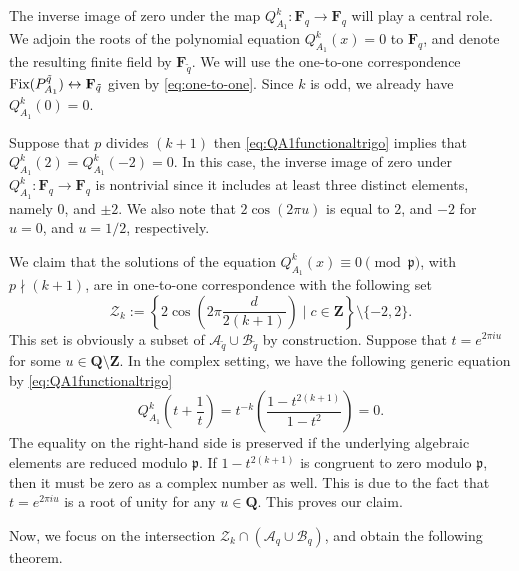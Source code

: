 \documentclass{amsart}
\newcommand{\mf}{\mathfrak}
\newcommand{\mc}{\mathcal}
\newcommand{\Q}{\mathbf Q}
\newcommand{\Z}{\mathbf Z}
\newcommand{\F}{\mathbf F}
\newcommand{\Fix}{\textnormal{Fix}}
\numberwithin{equation}{section}
\theoremstyle{plain}
\theoremstyle{definition}
\begin{document}
The inverse image of zero under the map $Q_{A_{1}}^{k} : \F_{q} \to \F_{q}$ will play a central role. We adjoin the roots of the polynomial equation $Q_{A_{1}}^{k}(x)=0$ to $\F_q$, and denote the resulting finite field by $\F_{\tilde{q}}$. We will use the one-to-one correspondence $\Fix(P^{\tilde{q}}_{A_1}) \leftrightarrow \F_{\tilde{q}}$ given by \eqref{eq:one-to-one}. Since $k$ is odd, we already have $Q_{A_{1}}^{k}(0)=0$.

Suppose that $p$ divides $(k+1)$ then \eqref{eq:QA1functionaltrigo} implies that $Q^k_{A_1}(2) = Q^k_{A_1}(-2)=0$. In this case, the inverse image of zero under $Q_{A_{1}}^{k} : \F_{q} \to \F_{q}$ is nontrivial since it includes at least three distinct elements, namely $0$, and $\pm 2$. We also note that $2\cos(2\pi u)$ is equal to $2$, and $-2$ for $u=0$, and $u=1/2$, respectively.

We claim that the solutions of the equation $Q_{A_{1}}^{k}(x)\equiv 0 \pmod{\mf{p}}$, with $p \nmid (k+1)$, are in one-to-one correspondence with the following set
$$\mc{Z}_{k} := \left\{ 2\cos\left(2\pi \frac{d}{2(k+1)}\right) \mid c\in \Z \right\} \setminus \{-2,2\}.$$
This set is obviously a subset of $\mc{A}_{{\tilde{q}}} \cup \mc{B}_{{\tilde{q}}}$ by construction. Suppose that $t=e^{2\pi iu}$ for some $u\in \Q \setminus \Z$. In the complex setting, we have the following generic equation by \eqref{eq:QA1functionaltrigo} 
\begin{equation}\label{eq:QA1(alpha)}
	Q_{A_1}^k\left(t+\frac{1}{t} \right)= t^{-k}\left(\dfrac{1-t^{2(k+1)}}{1-t^2}\right) =0.
\end{equation}
The equality on the right-hand side is preserved if the underlying algebraic elements are reduced modulo $\mf{p}$. If $1-t^{2(k+1)}$ is congruent to zero modulo $\mf{p}$, then it must be zero as a complex number as well. This is due to the fact that  $t=e^{2\pi iu}$ is a root of unity for any $u\in\Q$. This proves our claim. 

Now, we focus on the intersection $\mc{Z}_{k} \cap (\mc{A}_{q} \cup \mc{B}_{q})$, and obtain the following theorem.
\end{document}
